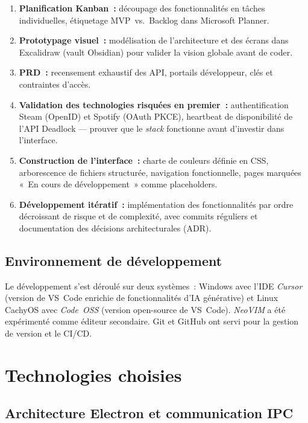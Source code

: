 \documentclass[12pt,a4paper]{article}
\begin{document}
\begin{enumerate}[leftmargin=*, label=\textbf{\arabic*.}]
  \item \textbf{Planification Kanban~:} découpage des fonctionnalités en
    tâches individuelles, étiquetage MVP~vs.~Backlog dans Microsoft
    Planner.
  \item \textbf{Prototypage visuel~:} modélisation de l'architecture et
    des écrans dans Excalidraw (vault Obsidian) pour valider la vision
    globale avant de coder.
  \item \textbf{PRD~:} recensement exhaustif des API, portails
    développeur, clés et contraintes d'accès.
  \item \textbf{Validation des technologies risquées en premier~:}
    authentification Steam (OpenID) et Spotify (OAuth PKCE), heartbeat
    de disponibilité de l'API Deadlock --- prouver que le \textit{stack}
    fonctionne avant d'investir dans l'interface.
  \item \textbf{Construction de l'interface~:} charte de couleurs
    définie en CSS, arborescence de fichiers structurée, navigation
    fonctionnelle, pages marquées «~En cours de développement~» comme
    placeholders.
  \item \textbf{Développement itératif~:} implémentation des
    fonctionnalités par ordre décroissant de risque et de complexité,
    avec commits réguliers et documentation des décisions
    architecturales (ADR).
\end{enumerate}

\subsection{Environnement de développement}

Le développement s'est déroulé sur deux systèmes~: Windows avec l'IDE
\textit{Cursor} (version de VS~Code enrichie de fonctionnalités d'IA
générative) et Linux CachyOS avec \textit{Code~OSS} (version open-source
de VS~Code). \textit{NeoVIM} a été expérimenté comme éditeur secondaire.
Git et GitHub ont servi pour la gestion de version et le CI/CD.

\section{Technologies choisies}

\subsection{Architecture Electron et communication IPC}
\end{document}
